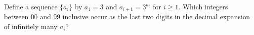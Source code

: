 Define a sequence $\{a_i\}$ by $a_1=3$ and $a_{i+1}=3^{a_i}$ for
$i\geq 1$. Which integers between 00 and 99 inclusive occur as the
last two digits in the decimal expansion of infinitely many $a_i$?
